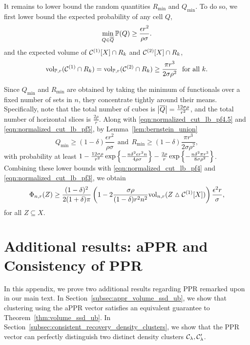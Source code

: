 	It remains to lower bound the random quantities $R_{\min}$ and $Q_{\min}$.
	To do so, we first lower bound the expected probability of any cell $Q$,
	\begin{equation}
	\label{eqn:normalized_cut_lb_pf4.5}
	\min_{Q \in \overline{Q}} \mathbb{P}(Q) \geq \frac{\epsilon r^2}{\rho \sigma}.
	\end{equation}
	and the expected volume of $\mathcal{C}^{(1)}[X] \cap R_k$ and $\mathcal{C}^{(2)}[X] \cap R_k$,
	\begin{equation}
	\label{eqn:normalized_cut_lb_pf5}
	\mathrm{vol}_{\mathbb{P},r}(\mathcal{C}^{(1)} \cap R_k) = \mathrm{vol}_{\mathbb{P},r}(\mathcal{C}^{(2)} \cap R_k) \geq \frac{\pi r^3}{2 \sigma \rho^2}~~\textrm{for all $k$.} 
	\end{equation}
	
	Since $Q_{\min}$ and $R_{\min}$ are obtained by taking the minimum of functionals over a fixed number of sets in $n$, they concentrate tightly around their means. Specifically, note that the total number of cubes is $\left \lvert \overline{Q} \right \rvert = \frac{12 \sigma \rho}{r^2}$, and the total number of horizontal slices is $\frac{2\rho}{r}$. Along with \eqref{eqn:normalized_cut_lb_pf4.5} and \eqref{eqn:normalized_cut_lb_pf5}, by Lemma~\ref{lem:bernstein_union} 
	\begin{equation*}
	Q_{\min} \geq (1 - \delta)\frac{\epsilon r^2}{\rho \sigma} ~~\textrm{and}~~ R_{\min} \geq (1 - \delta)\frac{\pi r^3}{2\sigma \rho^2 },
	\end{equation*}
	with probability at least $1 - \frac{12 \sigma \rho}{r^2}\exp\left\{-\frac{n\delta^2\epsilon r^2 n}{4 \rho \sigma}\right\} - \frac{2\rho}{r}\exp\left\{-\frac{n\delta^2\pi r^3}{8\sigma\rho^2}\right\}$. Combining these lower bounds with \eqref{eqn:normalized_cut_lb_pf4} and \eqref{eqn:normalized_cut_lb_pf3}, we obtain 
	\begin{equation*}	
	\Phi_{n,r}(Z) \geq \frac{(1 - \delta)^2}{2(1 + \delta)\pi} \left(1 - 2 \frac{\sigma \rho}{(1 - \delta) r^2 n^2} \mathrm{vol}_{n,r}(Z \vartriangle \mathcal{C}^{(1)}[X]) \right) \frac{\epsilon^2 r}{\sigma},
	\end{equation*}
	for all $Z \subseteq X$.

\section{Additional results: aPPR and Consistency of PPR}
\label{apdx:appr_misclassification_error}
In this appendix, we prove two additional results regarding PPR remarked upon in our main text. In Section~\ref{subsec:appr_volume_ssd_ub}, we show that clustering using the aPPR vector satisfies an equivalent guarantee to Theorem~\ref{thm:volume_ssd_ub}. In Section~\ref{subsec:consistent_recovery_density_clusters}, we show that the PPR vector can perfectly distinguish two distinct density clusters $\mathcal{C}_{\lambda},\mathcal{C}_{\lambda}'$. 

